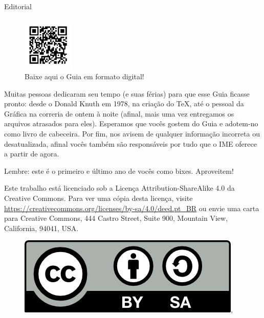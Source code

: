 \begin{editorial}{Editorial}
\paragraph{}
\begin{figure}
  \begin{center}
    \includegraphics[width=0.22\textwidth]{img/qrcode.pdf}
  \end{center}
  \vspace{-20pt}
  \caption{Baixe aqui o Guia em formato digital!}
  \vspace{80pt}
\end{figure} 
Muitas pessoas dedicaram seu tempo (e suas férias) para que esse Guia ficasse
pronto: desde o Donald Knuth em 1978, na criação do \TeX\makebox{}, até o
pessoal da Gráfica na correria de ontem à noite (afinal, mais uma vez
entregamos os arquivos atrasados para eles). Esperamos que vocês gostem do Guia
e adotem-no como livro de cabeceira. Por fim, nos avisem de qualquer informação
incorreta ou desatualizada, afinal vocês também são responsáveis por tudo que o
IME oferece a partir de agora.

Lembre: este é o primeiro e último ano de vocês como bixes. Aproveitem!


Este trabalho está licenciado sob a Licença Attribution-ShareAlike 4.0 da
Creative Commons. Para ver uma cópia desta licença, visite
\url{https://creativecommons.org/licenses/by-sa/4.0/deed.pt_BR} ou envie
uma carta para Creative Commons, 444 Castro Street, Suite 900, Mountain View,
California, 94041, USA.
\\
\begin{figure}[H]
    \centering
    \includegraphics{img/cc/by-sa.png},
\end{figure}

\end{editorial}
